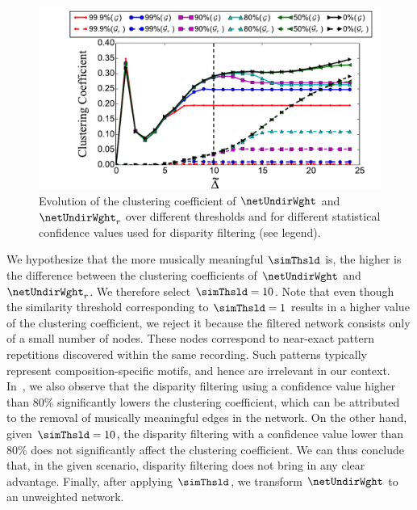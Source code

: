 {\begin{figure}
	\begin{center}
		\includegraphics[width=\figSizeNinety]{ch06_patterns/figures/Characterization/CC_Curves_shrunk.pdf}
	\end{center}
	\caption[Evolution of the clustering coefficient of a network of melodic patterns]{Evolution of the clustering coefficient of $\netUndirWght$ and $\netUndirWght_r$ over different thresholds and for different statistical confidence values used for disparity filtering (see legend).}
	\label{fig:cc_curve_pattern_characterization}
\end{figure}

We hypothesize that the more musically meaningful $\simThsld$ is, the higher is the difference between the clustering coefficients of $\netUndirWght$ and $\netUndirWght_r$. We therefore select $\simThsld=10$. Note that even though the similarity threshold corresponding to $\simThsld=1$ results in a higher value of the clustering coefficient, we reject it because the filtered network consists only of a small number of nodes. These nodes correspond to near-exact pattern repetitions discovered within the same recording. Such patterns typically represent composition-specific motifs, and hence are irrelevant in our context. In~, we also observe that the disparity filtering using a confidence value higher than 80\% significantly lowers the clustering coefficient, which can be attributed to the removal of musically meaningful edges in the network. On the other hand, given $\simThsld=10$, the disparity filtering with a confidence value lower than 80\% does not significantly affect the clustering coefficient. We can thus conclude that, in the given scenario, disparity filtering does not bring in any clear advantage. Finally, after applying $\simThsld$, we transform $\netUndirWght$ to an unweighted network. 


}
